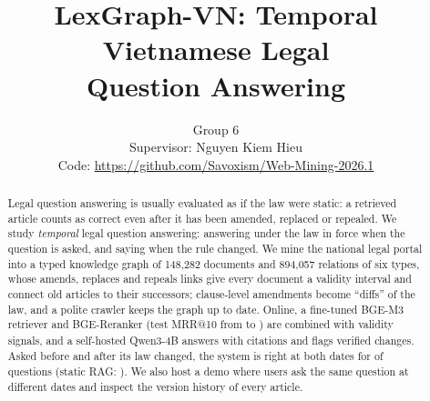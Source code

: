 \documentclass{article} %
\title{LexGraph-VN: Temporal Vietnamese Legal \\ Question Answering}
\author{Group 6 \\
Supervisor: Nguyen Kiem Hieu \\
Code: \url{https://github.com/Savoxism/Web-Mining-2026.1}}
\begin{document}
\maketitle
{}

\begin{abstract}
Legal question answering is usually evaluated as if the law were static: a retrieved article counts as correct even
after it has been amended, replaced or repealed. We study \emph{temporal} legal question answering: answering under the
law in force when the question is asked, and saying when the rule changed. We mine the national legal portal into a
typed knowledge graph of 148,282 documents and 894,057 relations of six types, whose amends, replaces and repeals links give every
document a validity interval and connect old articles to their successors; clause-level amendments become ``diffs'' of
the law, and a polite crawler keeps the graph up to date. Online, a fine-tuned BGE-M3 retriever and BGE-Reranker (test
MRR@10 from \textbf{\ResZsCeMrr} to \textbf{\ResFtCeMrr}) are combined with validity signals, and a self-hosted Qwen3-4B
answers with citations and flags verified changes. Asked before and after its law changed, the system is right at both
dates for \textbf{\ResTtBothPct} of questions (static RAG: \ResTtStaticBothPct). We also host a demo where users ask the
same question at different dates and inspect the version history of every article.
\end{abstract}
\end{document}
